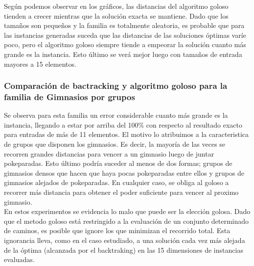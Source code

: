 Según podemos observar en los gráficos, las distancias del algoritmo goloso tienden a crecer mientras que la solución exacta se mantiene. Dado que los tamaños son pequeños y la familia es totalmente aleatoria, es probable que para las instancias generadas suceda que las distancias de las soluciones óptimas varíe poco, pero el algoritmo goloso siempre tiende a empeorar la solución cuanto más grande es la instancia. Esto último se verá mejor luego con tamaños de entrada mayores a 15 elementos.

\subsubsection*{Comparación de bactracking y algoritmo goloso para la familia de Gimnasios por grupos} 

   \begin{figure}[h]
 \centering
       \label{fig:randomexacto}
    \label{fig:randomgoloso}
    \end{figure}

Se observa para esta familia un error considerable cuanto más grande es la instancia, llegando a estar por arriba del 100\% con respecto al resultado exacto para entradas de más de 11 elementos. El motivo lo atribuimos a la caracteristica de grupos que disponen los gimnasios. Es decir, la mayoría de las veces se recorren grandes distancias para vencer a un gimnasio luego de juntar pokeparadas. Esto último podría suceder al menos de dos formas; grupos de gimnasios densos que hacen que haya pocas pokeparadas entre ellos y grupos de gimnasios alejados de pokeparadas. En cualquier caso, se obliga al goloso a recorrer más distancia para obtener el poder suficiente para vencer al proximo gimnasio.\\

En estos experimentos se evidencia lo malo que puede ser la elección golosa. Dado que el metodo goloso está restringido a la evaluación de un conjunto determinado de caminos, es posible que ignore los que minimizan el recorrido total. Esta ignorancia lleva, como en el caso estudiado, a una solución cada vez más alejada de la óptima (alcanzada por el backtraking) en las 15 dimensiones de instancias evaluadas.
